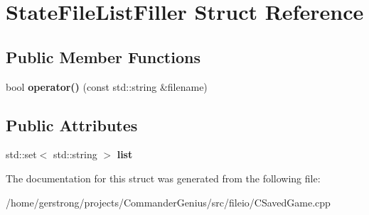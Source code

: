 \hypertarget{struct_state_file_list_filler}{
\section{StateFileListFiller Struct Reference}
\label{struct_state_file_list_filler}
}
\subsection*{Public Member Functions}
\begin{DoxyCompactItemize}
\item 
\hypertarget{struct_state_file_list_filler_ad01d2817ce38ad49fc29fbd6697baaef}{
bool {\bfseries operator()} (const std::string \&filename)}
\label{struct_state_file_list_filler_ad01d2817ce38ad49fc29fbd6697baaef}

\end{DoxyCompactItemize}
\subsection*{Public Attributes}
\begin{DoxyCompactItemize}
\item 
\hypertarget{struct_state_file_list_filler_af7164cd09ecf1eb737b02fea0d3bfe69}{
std::set$<$ std::string $>$ {\bfseries list}}
\label{struct_state_file_list_filler_af7164cd09ecf1eb737b02fea0d3bfe69}

\end{DoxyCompactItemize}


The documentation for this struct was generated from the following file:\begin{DoxyCompactItemize}
\item 
/home/gerstrong/projects/CommanderGenius/src/fileio/CSavedGame.cpp\end{DoxyCompactItemize}
